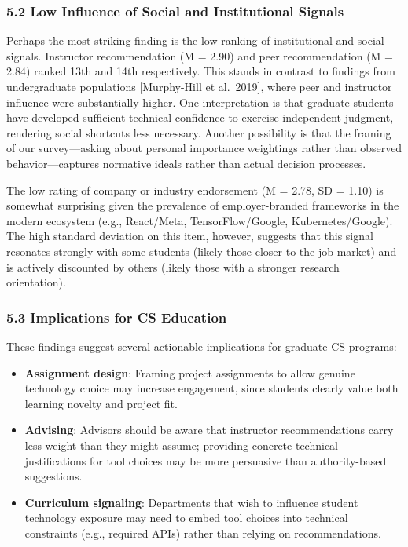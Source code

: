 \documentclass[
]{article}
\providecommand{\tightlist}{%
  \setlength{\itemsep}{0pt}\setlength{\parskip}{0pt}}
\begin{document}
\subsubsection{5.2 Low Influence of Social and Institutional
Signals}\label{low-influence-of-social-and-institutional-signals}

Perhaps the most striking finding is the low ranking of institutional
and social signals. Instructor recommendation (M = 2.90) and peer
recommendation (M = 2.84) ranked 13th and 14th respectively. This stands
in contrast to findings from undergraduate populations {[}Murphy-Hill et
al.~2019{]}, where peer and instructor influence were substantially
higher. One interpretation is that graduate students have developed
sufficient technical confidence to exercise independent judgment,
rendering social shortcuts less necessary. Another possibility is that
the framing of our survey---asking about personal importance weightings
rather than observed behavior---captures normative ideals rather than
actual decision processes.

The low rating of company or industry endorsement (M = 2.78, SD = 1.10)
is somewhat surprising given the prevalence of employer-branded
frameworks in the modern ecosystem (e.g., React/Meta, TensorFlow/Google,
Kubernetes/Google). The high standard deviation on this item, however,
suggests that this signal resonates strongly with some students (likely
those closer to the job market) and is actively discounted by others
(likely those with a stronger research orientation).

\subsubsection{5.3 Implications for CS
Education}\label{implications-for-cs-education}

These findings suggest several actionable implications for graduate CS
programs:

\begin{itemize}
\tightlist
\item
  \textbf{Assignment design}: Framing project assignments to allow
  genuine technology choice may increase engagement, since students
  clearly value both learning novelty and project fit.
\item
  \textbf{Advising}: Advisors should be aware that instructor
  recommendations carry less weight than they might assume; providing
  concrete technical justifications for tool choices may be more
  persuasive than authority-based suggestions.
\item
  \textbf{Curriculum signaling}: Departments that wish to influence
  student technology exposure may need to embed tool choices into
  technical constraints (e.g., required APIs) rather than relying on
  recommendations.
\end{itemize}
\end{document}
